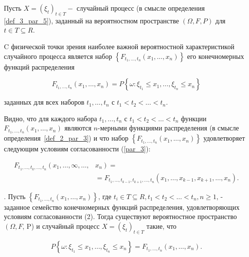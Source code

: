 Пусть $X=\left(\xi_{t}\right)_{t \in T}-$ случайный процесс (в смысле определения \ref{def_3_par_5}), заданный на вероятностном пространстве $(\Omega, {F}, {P})$ для $t \in T \subseteq R$.

C физической точки зрения наиболее важной вероятностной характеристикой случайного процесса является набор $\left\{F_{t_{1}, \ldots, t_{n}}\left(x_{1}, \ldots, x_{n}\right)\right\}$ его конечномерных функций распределения

$$
F_{t_{1}, \ldots, t_{n}}\left(x_{1}, \ldots, x_{n}\right)={P}\left\{\omega: \xi_{t_{1}} \leqslant x_{1}, \ldots, \xi_{t_{n}} \leqslant x_{n}\right\}
$$

заданных для всех наборов $t_{1}, \ldots, t_{n}$ с $t_{1}<t_{2}<\ldots<t_{n}$.

Видно, что для каждого набора $t_{1}, \ldots, t_{n}$ с $t_{1}<t_{2}<\ldots<t_{n}$ функции $F_{t_{1}, \ldots, t_{n}}\left(x_{1}, \ldots, x_{n}\right)$ являются $n$-мерными функциями распределения (в смысле определения~\ref{def_2_par_3}) и что набор $\left\{F_{t_{1}, \ldots, t_{n}}\left(x_{1}, \ldots, x_{n}\right)\right\}$ удовлетворяет следующим условиям согласованности (\ref{par_3}):

$$
\begin{aligned}
F_{t_{1}, \ldots, t_{k}, \ldots, t_{n}}\left(x_{1}, \ldots, \infty, \ldots,\right. & \left.x_{n}\right)= \\
& =F_{t_{1}, \ldots, t_{k-1}, t_{k+1}, \ldots, t_{n}}\left(x_{1}, \ldots, x_{k-1}, x_{k+1}, \ldots, x_{n}\right) .
\end{aligned}
$$


\begin{theorem}. Пусть $\left\{F_{t_{1}, \ldots, t_{n}}\left(x_{1}, \ldots, x_{n}\right)\right\}$, где $t_{i} \in T \subseteq R, t_{1}<t_{2}<\ldots<t_{n}, n \geqslant 1$, - заданное семейство конечномерных функций распределения, удовлетворяющих условиям согласованности (2). Тогда существуют вероятностное пространство $\left(\Omega, {F}\right.$, P) и случайный процесс $X=\left(\xi_{t}\right)_{t \in T}$ такие, что

$$
{P}\left\{\omega: \xi_{t_{1}} \leqslant x_{1}, \ldots, \xi_{t_{n}} \leqslant x_{n}\right\}=F_{t_{1}, \ldots, t_{n}}\left(x_{1}, \ldots, x_{n}\right) .
$$
\end{theorem}

